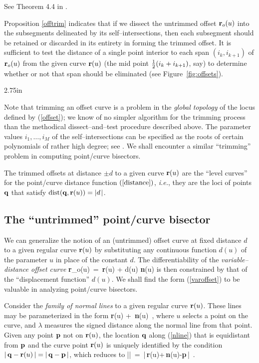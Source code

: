 \prf See Theorem 4.4 in \cite{farouki90a}. \QED

Proposition \ref{offtrim} indicates that if we dissect the
untrimmed offset ${\bf r}_o(u)$ into the subsegments delineated by
its self--intersections, then each subsegment should be retained
or discarded in its entirety in forming the trimmed offset. It is
sufficient to test the distance of a single point interior to each
span $(i_k,i_{k+1})$ of ${\bf r}_o(u)$ from the given curve ${\bf r}
(u)$ (the mid point $\textstyle{1 \over 2}\displaystyle(i_k+i_{k+1})$, say) to determine whether
or not that span should be eliminated (see Figure~\ref{fig:offsets}).

{2.75in}

Note that trimming an offset curve is a problem in the {\it global
topology\/} of the locus defined by (\ref{offset}); we know of
no simpler algorithm for the trimming process than the methodical
dissect--and--test procedure described above. The parameter values
${i_1,\ldots,i_M}$ of the self--intersections can be specified as
the roots of certain polynomials of rather high degree; see \cite
{farouki90b}. We shall encounter a similar ``trimming'' problem in
computing point/curve bisectors.

\begin{rmk}
{\rm
The trimmed offsets at distance $\pm d$ to a given curve ${\bf r}(u)$
are the ``level curves'' for the point/curve distance function $(\ref
{distance})$, {\it i.e.}, they are the loci of points ${\bf q}$ that
satisfy ${\rm dist}({\bf q},{\bf r}(u))=|d\;\!|$.
}
\end{rmk}

\subsection{The ``untrimmed'' point/curve bisector}
\label{sec:untrim}

We can generalize the notion of an (untrimmed) offset curve at fixed
distance $d$ to a given regular curve ${\bf r}(u)$ by substituting
any continuous function $d(u)$ of the parameter $u$ in place of the
constant $d$. The differentiability of the {\it variable--distance
offset curve}
\be \label{varoffset}
{\bf r}_o(u) \,=\, {\bf r}(u) + d(u) {\bf n}(u)
\ee
is then constrained by that of the ``displacement function'' $d(u)$.
We shall find the form (\ref{varoffset}) to be valuable in analyzing
point/curve bisectors.

Consider the {\it family of normal lines\/} to a given regular curve
${\bf r}(u)$. These lines may be parameterized in the form
\be \label{nline}
{\bf r}(u) + \lambda\,{\bf n}(u) \,,
\ee
where $u$ selects a point on the curve, and $\lambda$ measures the
signed distance along the normal line from that point. Given any point
${\bf p}$ not on ${\bf r}(u)$, the location ${\bf q}$
along (\ref{nline}) that is equidistant from ${\bf p}$ and
the curve point ${\bf r}(u)$ is uniquely identified by the condition
$|\,{\bf q}-{\bf r}(u)\,|=|\,{\bf q}-{\bf p}\,|$, which reduces to
\be \label{lambda}
|\lambda| \,=\, |\,{\bf r}(u)+\lambda\,{\bf n}(u)-{\bf p}\,| \,.
\ee

